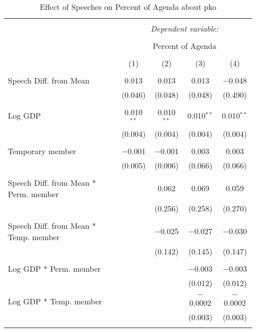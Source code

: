 
\begin{table}[!htbp] \centering 
  \caption{Effect of Speeches on Percent of Agenda about pko} 
  \label{} 
\begin{tabular}{@{\extracolsep{5pt}}lcccc} 
\\[-1.8ex]\hline 
\hline \\[-1.8ex] 
 & \multicolumn{4}{c}{\textit{Dependent variable:}} \\ 
\cline{2-5} 
\\[-1.8ex] & \multicolumn{4}{c}{Percent of Agenda} \\ 
\\[-1.8ex] & (1) & (2) & (3) & (4)\\ 
\hline \\[-1.8ex] 
 Speech Diff. from Mean & 0.013 & 0.013 & 0.013 & $-$0.048 \\ 
  & (0.046) & (0.048) & (0.048) & (0.490) \\ 
  & & & & \\ 
 Log GDP & 0.010$^{**}$ & 0.010$^{**}$ & 0.010$^{**}$ & 0.010$^{**}$ \\ 
  & (0.004) & (0.004) & (0.004) & (0.004) \\ 
  & & & & \\ 
 Temporary member & $-$0.001 & $-$0.001 & 0.003 & 0.003 \\ 
  & (0.005) & (0.006) & (0.066) & (0.066) \\ 
  & & & & \\ 
 Speech Diff. from Mean * Perm. member &  & 0.062 & 0.069 & 0.059 \\ 
  &  & (0.256) & (0.258) & (0.270) \\ 
  & & & & \\ 
 Speech Diff. from Mean * Temp. member &  & $-$0.025 & $-$0.027 & $-$0.030 \\ 
  &  & (0.142) & (0.145) & (0.147) \\ 
  & & & & \\ 
 Log GDP * Perm. member &  &  & $-$0.003 & $-$0.003 \\ 
  &  &  & (0.012) & (0.012) \\ 
  & & & & \\ 
 Log GDP * Temp. member &  &  & $-$0.0002 & $-$0.0002 \\ 
  &  &  & (0.003) & (0.003) \\ 
  & & & & \\ 

\end{tabular}
\end{table}
